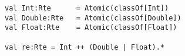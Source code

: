 \begin{lstlisting}[style=reclojureScala]
val Int:Rte      = Atomic(classOf[Int])
val Double:Rte   = Atomic(classOf[Double])
val Float:Rte    = Atomic(classOf[Float])

val re:Rte = Int ++ (Double | Float).*
\end{lstlisting}
